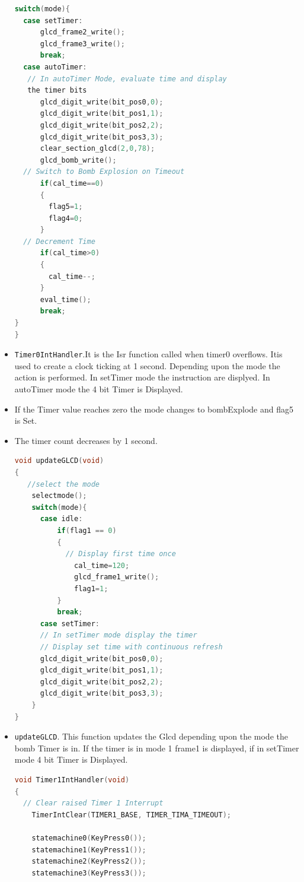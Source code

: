 \documentclass{article}
\begin{document}
\begin{itemize}
\begin{lstlisting}[basicstyle = \small, language = C]
switch(mode){
  case setTimer:
      glcd_frame2_write();
      glcd_frame3_write();
      break;
  case autoTimer:
   // In autoTimer Mode, evaluate time and display
   the timer bits
      glcd_digit_write(bit_pos0,0);
      glcd_digit_write(bit_pos1,1);
      glcd_digit_write(bit_pos2,2);
      glcd_digit_write(bit_pos3,3);
      clear_section_glcd(2,0,78);
      glcd_bomb_write();
  // Switch to Bomb Explosion on Timeout
      if(cal_time==0)
      {
        flag5=1;
        flag4=0;
      }
  // Decrement Time
      if(cal_time>0)
      {
        cal_time--;
      }
      eval_time();
      break;
}
}
  \end{lstlisting}
  \item \texttt{Timer0IntHandler}.It is the Isr function called when timer0 overflows. Itis used to create a clock ticking at 1 second. Depending upon the mode the action is performed. In setTimer mode the instruction are displyed. In autoTimer mode the 4 bit Timer is Displayed.
  \item If the Timer value reaches zero the mode changes to bombExplode and flag5 is Set.
  \item The timer count decreases by 1 second.
      \begin{lstlisting}[basicstyle = \small, language = C]
void updateGLCD(void)
{
   //select the mode
    selectmode();
    switch(mode){
      case idle:
          if(flag1 == 0)
          {
            // Display first time once
              cal_time=120;
              glcd_frame1_write();
              flag1=1;
          }
          break;
      case setTimer:
      // In setTimer mode display the timer
      // Display set time with continuous refresh
      glcd_digit_write(bit_pos0,0);
      glcd_digit_write(bit_pos1,1);
      glcd_digit_write(bit_pos2,2);
      glcd_digit_write(bit_pos3,3);
    }
}
  \end{lstlisting}
  \item \texttt{updateGLCD}. This function updates the Glcd depending upon the mode the bomb Timer is in. If the timer is in mode 1 frame1 is displayed, if in setTimer mode 4 bit Timer is Displayed.
      \begin{lstlisting}[basicstyle = \small, language = C]
void Timer1IntHandler(void)
{
  // Clear raised Timer 1 Interrupt
    TimerIntClear(TIMER1_BASE, TIMER_TIMA_TIMEOUT);

    statemachine0(KeyPress0());
    statemachine1(KeyPress1());
    statemachine2(KeyPress2());
    statemachine3(KeyPress3());


\end{lstlisting}
\end{itemize}
\end{document}
